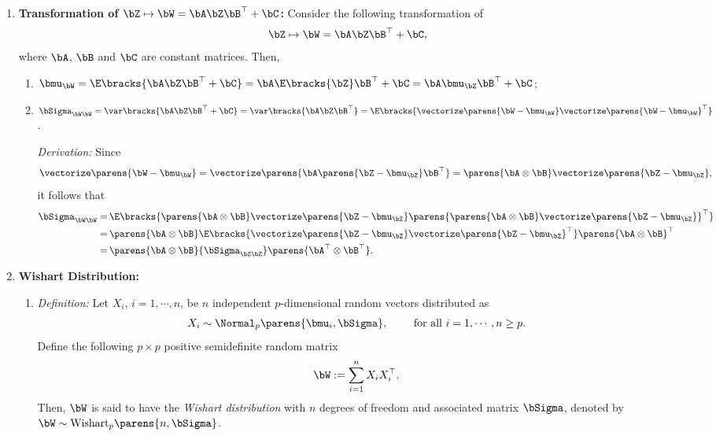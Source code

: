 \documentclass[12pt]{article}
\begin{document}
\begin{enumerate}[label=\textbf{\arabic*.}]
	\item \textbf{Transformation of $\bZ \mapsto \bW = \bA \bZ \bB^\top + \bC$:} Consider the following transformation of 
	\begin{align*}
		\bZ \mapsto \bW = \bA \bZ \bB^\top + \bC, 
	\end{align*}
	where $\bA$, $\bB$ and $\bC$ are constant matrices. Then, 
	\begin{enumerate}
		\item $\bmu_{\bW} = \E \bracks{\bA \bZ \bB^\top + \bC} = \bA \E \bracks{\bZ} \bB^\top + \bC = \bA \bmu_{\bZ} \bB^\top + \bC$; 
		\item $\bSigma_{\bW\bW} = \var \bracks{\bA \bZ \bB^\top + \bC} = \var \bracks{\bA \bZ \bB^\top} = \E \bracks{\vectorize \parens{\bW - \bmu_{\bW}} \vectorize \parens{\bW - \bmu_{\bW}}^\top}$. 
		
		\textit{Derivation:} Since 
		\begin{align*}
			\vectorize \parens{\bW - \bmu_{\bW}} = \vectorize \parens{\bA \parens{ \bZ - \bmu_{\bZ}} \bB^\top} = \parens{\bA \otimes \bB}\vectorize \parens{\bZ - \bmu_{\bZ}}, 
		\end{align*}
		it follows that 
		\begin{align*}
			\bSigma_{\bW\bW} = & \, \E \bracks{\parens{\bA \otimes \bB} \vectorize \parens{\bZ - \bmu_{\bZ}} \parens{\parens{\bA \otimes \bB} \vectorize \parens{\bZ - \bmu_{\bZ}}}^\top} \\ 
			= & \, \parens{\bA \otimes \bB} \E \bracks{\vectorize \parens{\bZ - \bmu_{\bZ}} \vectorize \parens{\bZ - \bmu_{\bZ}}^\top} \parens{\bA \otimes \bB}^\top \\ 
			= & \, \parens{\bA \otimes \bB} {\bSigma_{\bZ\bZ}} \parens{\bA^\top \otimes \bB^\top}. 
		\end{align*}
	\end{enumerate}
	
	\item \textbf{Wishart Distribution:} 
	\begin{enumerate}
		\item \textit{Definition:} Let $X_i$, $ i = 1, \cdots, n$, be $n$ independent $p$-dimensional random vectors distributed as 
		\begin{align*}
			X_i \sim \Normal_p \parens{\bmu_i, \bSigma} , \qquad \text{ for all } i = 1, \cdots, n \ge p. 
		\end{align*}
		Define the following $p \times p$ positive semidefinite random matrix 
		\begin{align*}
			\bW := \sum_{i=1}^n X_i X_i^\top. 
		\end{align*}
		Then, $\bW$ is said to have the \textit{Wishart distribution} with $n$ degrees of freedom and associated matrix $\bSigma$, denoted by $\bW \sim \mathrm{Wishart}_p \parens{n, \bSigma}$. 
		

\end{enumerate}
\end{enumerate}
\end{document}
